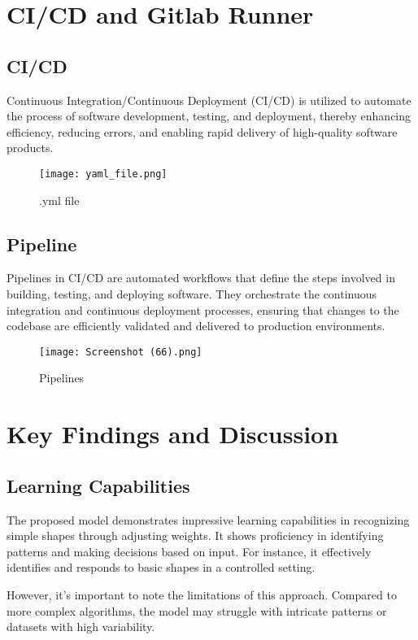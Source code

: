 \documentclass{article}
\begin{document}
\section{CI/CD and Gitlab Runner}
\subsection{CI/CD}
      Continuous Integration/Continuous Deployment (CI/CD) is utilized to automate the process of software development, testing, and deployment, thereby enhancing efficiency, reducing errors, and enabling rapid delivery of high-quality software products.
\begin{figure}[H]
    \centering
    \texttt{[image: yaml\_file.png]} 
    \caption{.yml file}
    \label{fig:enter-label}
\end{figure}
\subsection{Pipeline}

Pipelines in CI/CD are automated workflows that define the steps involved in building, testing, and deploying software. They orchestrate the continuous integration and continuous deployment processes, ensuring that changes to the codebase are efficiently validated and delivered to production environments.
\begin{figure}[H]
    \centering
    \texttt{[image: Screenshot (66).png]} 
    \caption{Pipelines}
    \label{fig:enter-label}
\end{figure}


\section{Key Findings and Discussion}

\subsection{Learning Capabilities}

The proposed model demonstrates impressive learning capabilities in recognizing simple shapes through adjusting weights. It shows proficiency in identifying patterns and making decisions based on input. For instance, it effectively identifies and responds to basic shapes in a controlled setting.

However, it's important to note the limitations of this approach. Compared to more complex algorithms, the model may struggle with intricate patterns or datasets with high variability.
\end{document}
